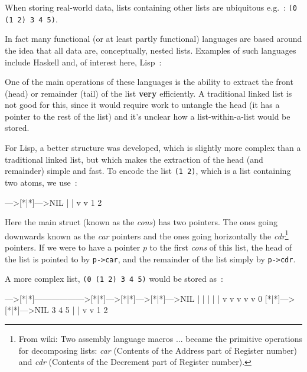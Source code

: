 
When storing real-world data, lists containing other lists are ubiquitous e.g.~:
\verb^(0 (1 2) 3 4 5)^.

\noindent In fact many functional (or at least partly functional) languages are
based around the idea that all data are, conceptually, nested lists. Examples
of such languages include Haskell and, of interest here, Lisp~:

One of the main operations of these languages is the ability to extract
the front (head) or remainder (tail) of the list {\bf very} efficiently.   
A traditional linked list is not good for this, since it would require work
to untangle the head (it has a pointer to the rest of the list) and
it's unclear how a list-within-a-list would be stored.

For Lisp, a better structure was developed, which is slightly more complex than
a traditional linked list, but which makes the extraction of the head (and remainder)
simple and fast. To encode the list \verb^(1 2)^, which is a list containing two atoms,
we use~:
\begin{terminaloutput}
[*|*]--->[*|*]--->NIL
 |        |
 v        v
 1        2
\end{terminaloutput}

\noindent Here the main struct (known as the {\it cons})
has two pointers.  The ones going
downwards known as the {\it car} pointers and the ones going horizontally
the {\it cdr}\footnote{ From wiki: Two assembly language macros $...$
became the primitive operations for decomposing lists: {\it car} (Contents
of the Address part of Register number) and {\it cdr} (Contents of the
Decrement part of Register number).  } pointers.
If we were to have a pointer $p$ to the first {\it cons} of this list, the head of the
list is pointed to by \verb^p->car^, and the remainder of the list simply by \verb^p->cdr^.

\newpage 

A more complex list, \verb^(0 (1 2) 3 4 5)^ would be stored as~:
\begin{terminaloutput}
[*|*]--->[*|*]------------------>[*|*]--->[*|*]--->[*|*]--->NIL
 |        |                       |        |        |
 v        v                       v        v        v
 0       [*|*]--->[*|*]--->NIL    3        4        5
          |        |
          v        v
          1        2
\end{terminaloutput}

